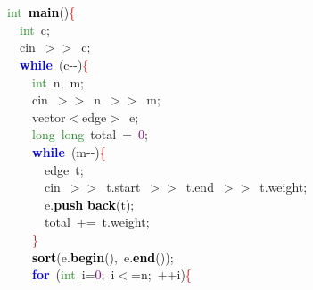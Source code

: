 {{\mbox{} \\
\mbox{} \\
\mbox{}\textcolor{ForestGreen}{int}\ \textbf{\textcolor{Black}{main}}\textcolor{BrickRed}{()}\textcolor{Red}{\{} \\
\mbox{}\ \ \textcolor{ForestGreen}{int}\ c\textcolor{BrickRed}{;} \\
\mbox{}\ \ cin\ \textcolor{BrickRed}{$>$$>$}\ c\textcolor{BrickRed}{;} \\
\mbox{}\ \ \textbf{\textcolor{Blue}{while}}\ \textcolor{BrickRed}{(}c\textcolor{BrickRed}{-\/-)}\textcolor{Red}{\{} \\
\mbox{}\ \ \ \ \textcolor{ForestGreen}{int}\ n\textcolor{BrickRed}{,}\ m\textcolor{BrickRed}{;} \\
\mbox{}\ \ \ \ cin\ \textcolor{BrickRed}{$>$$>$}\ n\ \textcolor{BrickRed}{$>$$>$}\ m\textcolor{BrickRed}{;} \\
\mbox{}\ \ \ \ vector\textcolor{BrickRed}{$<$}edge\textcolor{BrickRed}{$>$}\ e\textcolor{BrickRed}{;} \\
\mbox{}\ \ \ \ \textcolor{ForestGreen}{long}\ \textcolor{ForestGreen}{long}\ total\ \textcolor{BrickRed}{=}\ \textcolor{Purple}{0}\textcolor{BrickRed}{;} \\
\mbox{}\ \ \ \ \textbf{\textcolor{Blue}{while}}\ \textcolor{BrickRed}{(}m\textcolor{BrickRed}{-\/-)}\textcolor{Red}{\{} \\
\mbox{}\ \ \ \ \ \ edge\ t\textcolor{BrickRed}{;} \\
\mbox{}\ \ \ \ \ \ cin\ \textcolor{BrickRed}{$>$$>$}\ t\textcolor{BrickRed}{.}start\ \textcolor{BrickRed}{$>$$>$}\ t\textcolor{BrickRed}{.}end\ \textcolor{BrickRed}{$>$$>$}\ t\textcolor{BrickRed}{.}weight\textcolor{BrickRed}{;} \\
\mbox{}\ \ \ \ \ \ e\textcolor{BrickRed}{.}\textbf{\textcolor{Black}{push$\_$back}}\textcolor{BrickRed}{(}t\textcolor{BrickRed}{);} \\
\mbox{}\ \ \ \ \ \ total\ \textcolor{BrickRed}{+=}\ t\textcolor{BrickRed}{.}weight\textcolor{BrickRed}{;} \\
\mbox{}\ \ \ \ \textcolor{Red}{\}} \\
\mbox{}\ \ \ \ \textbf{\textcolor{Black}{sort}}\textcolor{BrickRed}{(}e\textcolor{BrickRed}{.}\textbf{\textcolor{Black}{begin}}\textcolor{BrickRed}{(),}\ e\textcolor{BrickRed}{.}\textbf{\textcolor{Black}{end}}\textcolor{BrickRed}{());} \\
\mbox{}\ \ \ \ \textbf{\textcolor{Blue}{for}}\ \textcolor{BrickRed}{(}\textcolor{ForestGreen}{int}\ i\textcolor{BrickRed}{=}\textcolor{Purple}{0}\textcolor{BrickRed}{;}\ i\textcolor{BrickRed}{$<$=}n\textcolor{BrickRed}{;}\ \textcolor{BrickRed}{++}i\textcolor{BrickRed}{)}\textcolor{Red}{\{} \\
}}
